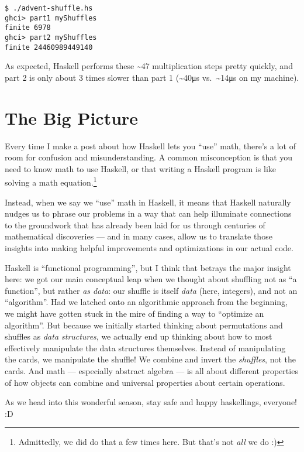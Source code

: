 \documentclass[]{article}
\begin{document}
\begin{verbatim}
$ ./advent-shuffle.hs
ghci> part1 myShuffles
finite 6978
ghci> part2 myShuffles
finite 24460989449140
\end{verbatim}

As expected, Haskell performs these \textasciitilde47 multiplication steps
pretty quickly, and part 2 is only about 3 times slower than part 1
(\textasciitilde40μs vs.~\textasciitilde14μs on my machine).

\section{The Big Picture}\label{the-big-picture}

Every time I make a post about how Haskell lets you ``use'' math, there's a lot
of room for confusion and misunderstanding. A common misconception is that you
need to know math to use Haskell, or that writing a Haskell program is like
solving a math equation.\footnote{Admittedly, we did do that a few times here.
  But that's not \emph{all} we do :)}

Instead, when we say we ``use'' math in Haskell, it means that Haskell naturally
nudges us to phrase our problems in a way that can help illuminate connections
to the groundwork that has already been laid for us through centuries of
mathematical discoveries --- and in many cases, allow us to translate those
insights into making helpful improvements and optimizations in our actual code.

Haskell is ``functional programming'', but I think that betrays the major
insight here: we got our main conceptual leap when we thought about shuffling
not as ``a function'', but rather \emph{as data}: our shuffle is itself
\emph{data} (here, integers), and not an ``algorithm''. Had we latched onto an
algorithmic approach from the beginning, we might have gotten stuck in the mire
of finding a way to ``optimize an algorithm''. But because we initially started
thinking about permutations and shuffles as \emph{data structures}, we actually
end up thinking about how to most effectively manipulate the data structures
themselves. Instead of manipulating the cards, we manipulate the shuffle! We
combine and invert the \emph{shuffles}, not the cards. And math --- especially
abstract algebra --- is all about different properties of how objects can
combine and universal properties about certain operations.

As we head into this wonderful season, stay safe and happy haskellings,
everyone! :D
\end{document}
